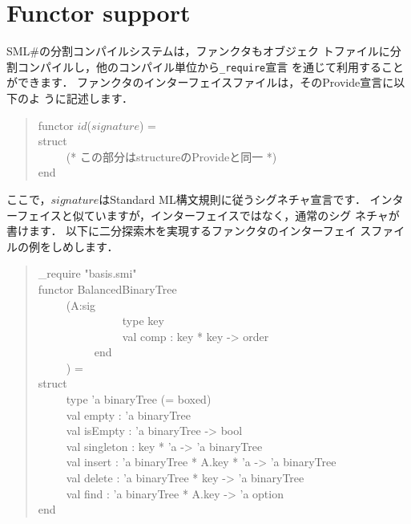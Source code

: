 \documentclass{jbook}
\newcommand{\txt}[2]{#2}
\newcommand{\smlsharp}{SML\#}
\newenvironment{program}{\begin{tt}\begin{quote}}{\end{quote}\end{tt}}
\newcommand{\myem}{\ \ \ \ \  }
\begin{document}
\section{\txt{ファンクタのサポート}{Functor support}}
\label{sec:tutorialFunctorInInterface}

\ifx\jp%
	\smlsharp{}の分割コンパイルシステムは，ファンクタもオブジェク
トファイルに分割コンパイルし，他のコンパイル単位から{\tt \_require}宣言
を通じて利用することができます．
	ファンクタのインターフェイスファイルは，そのProvide宣言に以下のよ
うに記述します．
\begin{program}
functor $id$($signature$) =\\
struct\\
\myem (* この部分はstructureのProvideと同一 *)\\
end
\end{program}
	ここで，$signature$はStandard ML構文規則に従うシグネチャ宣言です．
	インターフェイスと似ていますが，インターフェイスではなく，通常のシグ
ネチャが書けます．
	以下に二分探索木を実現するファンクタのインターフェイ
スファイルの例をしめします．
\begin{program}
\_require "basis.smi"\\
functor BalancedBinaryTree\\
\myem  (A:sig\\
\myem\myem\myem      type key\\
\myem\myem\myem      val comp : key * key -> order\\
\myem\myem    end\\
\myem  ) =\\
struct\\
\myem type 'a binaryTree (= boxed)\\
\myem  val empty : 'a binaryTree\\
\myem  val isEmpty : 'a binaryTree -> bool\\
\myem  val singleton : key * 'a -> 'a binaryTree\\
\myem  val insert : 'a binaryTree * A.key * 'a -> 'a binaryTree\\
\myem  val delete : 'a binaryTree * key -> 'a binaryTree\\
\myem  val find : 'a binaryTree * A.key -> 'a option\\
end
\end{program}
\end{document}
